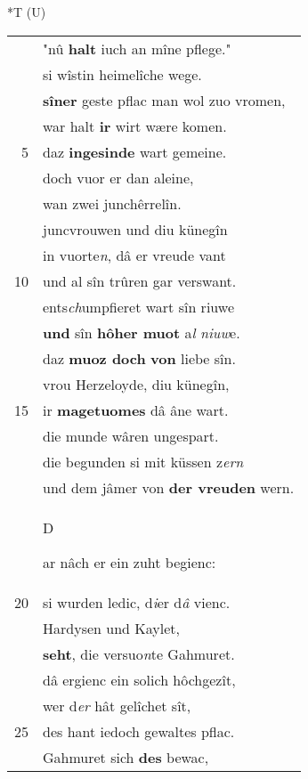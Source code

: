 \documentclass[8pt,a4paper,notitlepage]{article}
\begin{document}
\begin{table}[ht]
\begin{minipage}[t]{0.5\linewidth}
\end{minipage}
\hspace{0.5cm}
\begin{minipage}[t]{0.5\linewidth}
\small
\begin{center}*T (U)
\end{center}
\begin{tabular}{rl}
 & "nû \textbf{halt} iuch an mîne pflege."\\ 
 & si wîstin heimelîche wege.\\ 
 & \textbf{sîner} geste pflac man wol zuo vromen,\\ 
 & war halt \textbf{ir} wirt wære komen.\\ 
5 & daz \textbf{ingesinde} wart gemeine.\\ 
 & doch vuor er dan aleine,\\ 
 & wan zwei junchêrrelîn.\\ 
 & juncvrouwen und diu künegîn\\ 
 & in vuorte\textit{n}, dâ er vreude vant\\ 
10 & und al sîn trûren gar verswant.\\ 
 & ents\textit{ch}umpfieret wart sîn riuwe\\ 
 & \textbf{und} sîn \textbf{hôher muot} a\textit{l} \textit{niuw}e.\\ 
 & daz \textbf{muoz doch} \textbf{von} liebe sîn.\\ 
 & vrou Herzeloyde, diu künegîn,\\ 
15 & ir \textbf{magetuomes} dâ âne wart.\\ 
 & die munde wâren ungespart.\\ 
 & die begunden si mit küssen z\textit{ern}\\ 
 & und dem jâmer von \textbf{der vreuden} wern.\\ 
 & \begin{large}D\end{large}ar nâch er ein zuht begienc:\\ 
20 & si wurden ledic, d\textit{i}er d\textit{â} vienc.\\ 
 & Hardysen und Kaylet,\\ 
 & \textbf{seht}, die versuo\textit{n}te Gahmuret.\\ 
 & dâ ergienc ein solich hôchgezît,\\ 
 & wer d\textit{er} hât gelîchet sît,\\ 
25 & des hant iedoch gewaltes pflac.\\ 
 & Gahmuret sich \textbf{des} bewac,\\ 

\end{tabular}
\end{minipage}
\end{table}
\end{document}
